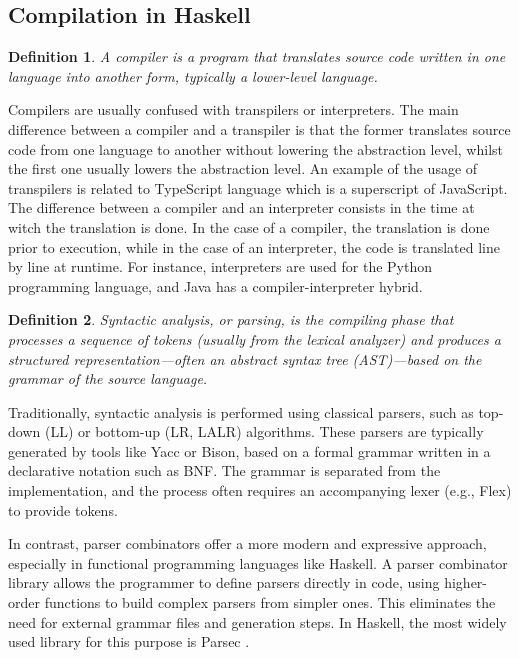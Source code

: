 \documentclass[12pt]{article}
\newtheorem{definition}{Definition}
\begin{document}
    \subsection{Compilation in Haskell}
        \begin{definition}
            A compiler is a program that translates source code written in one language into another form, typically a lower-level language.
        \end{definition}
        Compilers are usually confused with transpilers or interpreters. 
        The main difference between a compiler and a transpiler is that the former translates source code from one language to another without lowering the abstraction level, whilst the first one usually lowers the abstraction level. An example of the usage of transpilers is related to TypeScript language which is a superscript of JavaScript.
        The difference between a compiler and an interpreter consists in the time at witch the translation is done. In the case of a compiler, the translation is done prior to execution, while in the case of an interpreter, the code is translated line by line at runtime. For instance, interpreters are used for the Python programming language, and Java has a compiler-interpreter hybrid.
        \cite{alfred2007compilers}
        \begin{definition}
            Syntactic analysis, or parsing, is the compiling phase that processes a sequence of tokens (usually from the lexical analyzer) and produces a structured representation—often an abstract syntax tree (AST)—based on the grammar of the source language.
        \end{definition}
        
        Traditionally, syntactic analysis is performed using classical parsers, such as top-down (LL) or bottom-up (LR, LALR) algorithms. These parsers are typically generated by tools like Yacc or Bison, based on a formal grammar written in a declarative notation such as BNF. The grammar is separated from the implementation, and the process often requires an accompanying lexer (e.g., Flex) to provide tokens.
        \cite{alfred2007compilers}

        In contrast, parser combinators \cite{hutton1996monadic} offer a more modern and expressive approach, especially in functional programming languages like Haskell. A parser combinator library allows the programmer to define parsers directly in code, using higher-order functions to build complex parsers from simpler ones. This eliminates the need for external grammar files and generation steps. In Haskell, the most widely used library for this purpose is Parsec \cite{parsec}.
        
\end{document}
